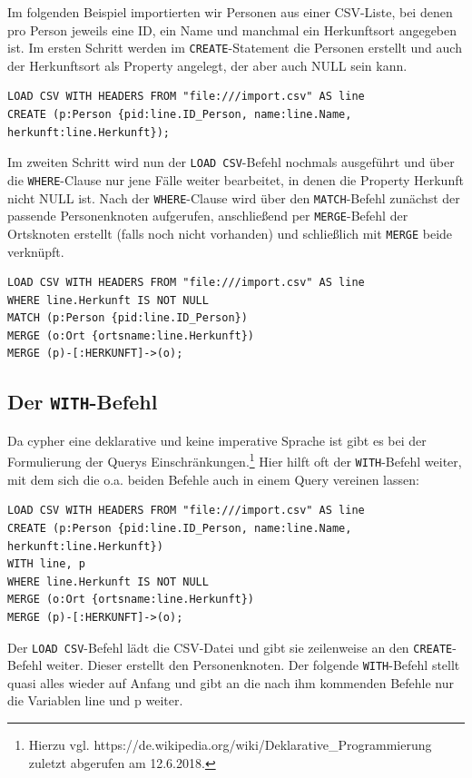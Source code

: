 \documentclass[12pt,ngerman,]{article}
\begin{document}
Im folgenden Beispiel importierten wir Personen aus einer CSV-Liste, bei
denen pro Person jeweils eine ID, ein Name und manchmal ein Herkunftsort
angegeben ist. Im ersten Schritt werden im \texttt{CREATE}-Statement die
Personen erstellt und auch der Herkunftsort als Property angelegt, der
aber auch NULL sein kann.

\begin{verbatim}
LOAD CSV WITH HEADERS FROM "file:///import.csv" AS line
CREATE (p:Person {pid:line.ID_Person, name:line.Name, herkunft:line.Herkunft});
\end{verbatim}

Im zweiten Schritt wird nun der \texttt{LOAD\ CSV}-Befehl nochmals
ausgeführt und über die \texttt{WHERE}-Clause nur jene Fälle weiter
bearbeitet, in denen die Property Herkunft nicht NULL ist. Nach der
\texttt{WHERE}-Clause wird über den \texttt{MATCH}-Befehl zunächst der
passende Personenknoten aufgerufen, anschließend per
\texttt{MERGE}-Befehl der Ortsknoten erstellt (falls noch nicht
vorhanden) und schließlich mit \texttt{MERGE} beide verknüpft.

\begin{verbatim}
LOAD CSV WITH HEADERS FROM "file:///import.csv" AS line
WHERE line.Herkunft IS NOT NULL
MATCH (p:Person {pid:line.ID_Person})
MERGE (o:Ort {ortsname:line.Herkunft})
MERGE (p)-[:HERKUNFT]->(o);
\end{verbatim}

\subsection{\texorpdfstring{Der
\texttt{WITH}-Befehl}{Der WITH-Befehl}}\label{der-with-befehl}

Da cypher eine deklarative und keine imperative Sprache ist gibt es bei
der Formulierung der Querys Einschränkungen.\footnote{Hierzu vgl.
  https://de.wikipedia.org/wiki/Deklarative\_Programmierung zuletzt
  abgerufen am 12.6.2018.} Hier hilft oft der \texttt{WITH}-Befehl
weiter, mit dem sich die o.a. beiden Befehle auch in einem Query
vereinen lassen:

\begin{verbatim}
LOAD CSV WITH HEADERS FROM "file:///import.csv" AS line
CREATE (p:Person {pid:line.ID_Person, name:line.Name, herkunft:line.Herkunft})
WITH line, p
WHERE line.Herkunft IS NOT NULL
MERGE (o:Ort {ortsname:line.Herkunft})
MERGE (p)-[:HERKUNFT]->(o);
\end{verbatim}

Der \texttt{LOAD\ CSV}-Befehl lädt die CSV-Datei und gibt sie
zeilenweise an den \texttt{CREATE}-Befehl weiter. Dieser erstellt den
Personenknoten. Der folgende \texttt{WITH}-Befehl stellt quasi alles
wieder auf Anfang und gibt an die nach ihm kommenden Befehle nur die
Variablen line und p weiter.
\end{document}
